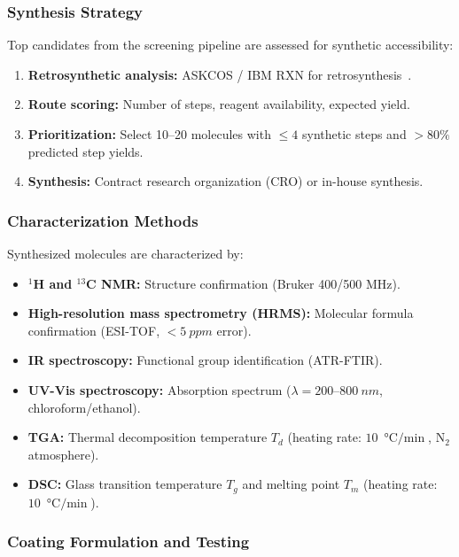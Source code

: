 \documentclass[12pt,a4paper]{article}
\begin{document}
\subsubsection{Synthesis Strategy}

Top candidates from the screening pipeline are assessed for synthetic accessibility:
\begin{enumerate}
    \item \textbf{Retrosynthetic analysis:} ASKCOS / IBM RXN for retrosynthesis~\cite{coley2017retrosynthesis}.
    \item \textbf{Route scoring:} Number of steps, reagent availability, expected yield.
    \item \textbf{Prioritization:} Select 10--20 molecules with $\leq 4$ synthetic steps and $> 80\%$ predicted step yields.
    \item \textbf{Synthesis:} Contract research organization (CRO) or in-house synthesis.
\end{enumerate}

\subsubsection{Characterization Methods}

Synthesized molecules are characterized by:
\begin{itemize}
    \item \textbf{$^1$H and $^{13}$C NMR:} Structure confirmation (Bruker 400/500 MHz).
    \item \textbf{High-resolution mass spectrometry (HRMS):} Molecular formula confirmation (ESI-TOF, $< \SI{5}{ppm}$ error).
    \item \textbf{IR spectroscopy:} Functional group identification (ATR-FTIR).
    \item \textbf{UV-Vis spectroscopy:} Absorption spectrum ($\lambda = 200$--$\SI{800}{nm}$, chloroform/ethanol).
    \item \textbf{TGA:} Thermal decomposition temperature $T_d$ (heating rate: $\SI{10}{\celsius\per\min}$, $\mathrm{N}_2$ atmosphere).
    \item \textbf{DSC:} Glass transition temperature $T_g$ and melting point $T_m$ (heating rate: $\SI{10}{\celsius\per\min}$).
\end{itemize}

\subsubsection{Coating Formulation and Testing}
\end{document}
